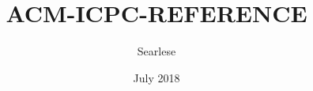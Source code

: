 \documentclass{article}
\title{ACM-ICPC-REFERENCE}
\author{ Searlese }
\date{July 2018}
\begin{document}
\maketitle
\newpage

\begin{multicols*}{2}
	{\selectfont
		\tableofcontents
	}

	\newpage

	\begin{python}[getContents.py]
	\end{python}

\end{multicols*}
\end{document}
